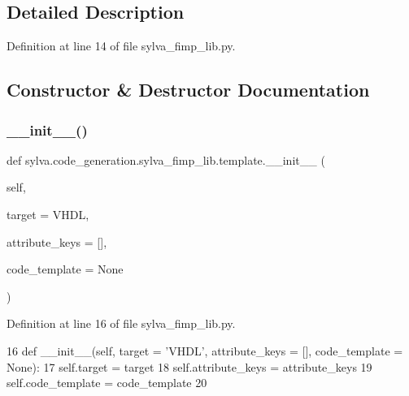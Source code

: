 \subsection{Detailed Description}


Definition at line 14 of file sylva\+\_\+fimp\+\_\+lib.\+py.



\subsection{Constructor \& Destructor Documentation}
\mbox{\label{classsylva_1_1code__generation_1_1sylva__fimp__lib_1_1template_a6d4b9e1d30b442c89fc9523b669670f8}} 
\subsubsection{\texorpdfstring{\+\_\+\+\_\+init\+\_\+\+\_\+()}{\_\_init\_\_()}}
{\footnotesize\ttfamily def sylva.\+code\+\_\+generation.\+sylva\+\_\+fimp\+\_\+lib.\+template.\+\_\+\+\_\+init\+\_\+\+\_\+ (\begin{DoxyParamCaption}\item[{}]{self,  }\item[{}]{target = {\ttfamily \textquotesingle{}VHDL\textquotesingle{}},  }\item[{}]{attribute\+\_\+keys = {\ttfamily \mbox{[}\mbox{]}},  }\item[{}]{code\+\_\+template = {\ttfamily None} }\end{DoxyParamCaption})}



Definition at line 16 of file sylva\+\_\+fimp\+\_\+lib.\+py.


\begin{DoxyCode}
16   \textcolor{keyword}{def }\_\_init\_\_(self, target = 'VHDL', attribute\_keys = [], code\_template = None):
17     self.target = target
18     self.attribute\_keys = attribute\_keys
19     self.code\_template = code\_template
20 
\end{DoxyCode}


